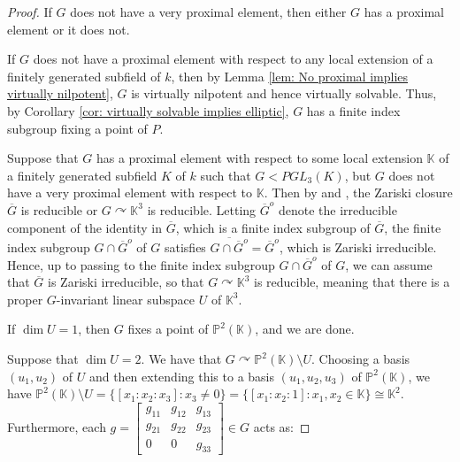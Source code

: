 \documentclass[12pt]{article}
\theoremstyle{definition}
\newcommand{\K}{\mathbb{K}}
\begin{document}
\begin{proof}
    If $G$ does not have a very proximal element, then either $G$ has a proximal element or it does not. 

    If $G$ does not have a proximal element with respect to any local extension of a finitely generated subfield of $k$, then by Lemma \ref{lem: No proximal implies virtually nilpotent}, $G$ is virtually nilpotent and hence virtually solvable. Thus, by Corollary \ref{cor: virtually solvable implies elliptic}, $G$ has a finite index subgroup fixing a point of $P$. 

    Suppose that $G$ has a proximal element with respect to some local extension $\K$ of a finitely generated subfield $K$ of $k$ such that $G < PGL_3(K)$, but $G$ does not have a very proximal element with respect to $\K$. Then by \cite[Proposition 15.9]{KapDrutu} and \cite[Proposition 15.16]{KapDrutu}, the Zariski closure $\overline{G}$ is reducible or $G \curvearrowright \K^3$ is reducible. Letting $\overline{G}^{o}$ denote the irreducible component of the identity in $\overline{G}$, which is a finite index subgroup of $\overline{G}$, the finite index subgroup $G \cap \overline{G}^{o}$ of $G$ satisfies $\overline{G \cap \overline{G}^{o}} = \overline{G}^o$, which is Zariski irreducible. Hence, up to passing to the finite index subgroup $G \cap \overline{G}^{o}$ of $G$, we can assume that $\overline{G}$ is Zariski irreducible, so that $G \curvearrowright \K^3$ is reducible, meaning that there is a proper $G$-invariant linear subspace $U$ of $\K^3$. %

    If $\dim U = 1$, then $G$ fixes a point of $\mathbb{P}^2(\K)$, and we are done.  
    
    Suppose that $\dim U = 2$. We have that $G \curvearrowright \mathbb{P}^2(\K) \setminus U$. Choosing a basis $(u_1, u_2)$ of $U$ and then extending this to a basis $(u_1, u_2, u_3)$ of $\mathbb{P}^2(\K)$, we have $\mathbb{P}^2(\K) \setminus U = \{[x_1:x_2:x_3] : x_3 \neq 0\} = \{[x_1:x_2:1]:x_1,x_2 \in \K\} \cong \K^2$. Furthermore, each $g = \begin{bmatrix}
        g_{11} & g_{12} & g_{13} \\
        g_{21} & g_{22} & g_{23} \\
        0 & 0 & g_{33}
    \end{bmatrix} \in G$ acts as:


\end{proof}
\end{document}
